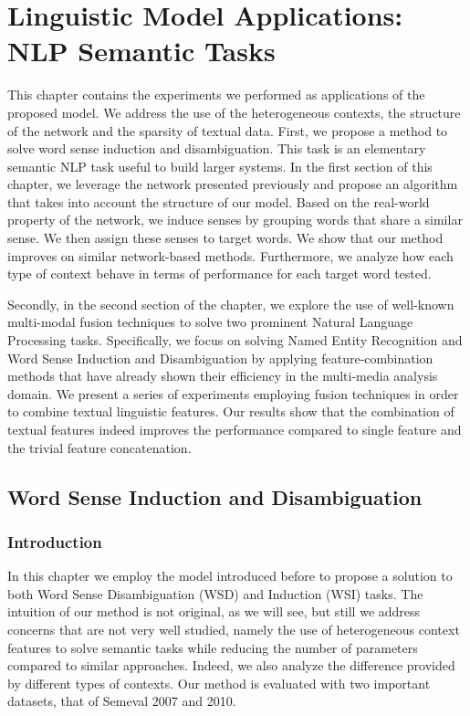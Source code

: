 \chapter{Linguistic Model Applications: NLP Semantic Tasks} 
\label{chap:wsd}
\begin{abstractchap}
This chapter contains the experiments we performed as applications of the proposed model. We address the use of the heterogeneous contexts, the structure of the network and the sparsity of textual data.
First, we propose a method to solve word sense induction and disambiguation. This task is an elementary semantic NLP task useful to build larger systems. In the first section of this chapter, we leverage the network presented previously and propose an algorithm that takes into account the structure of our model. Based on the real-world property of the network, we induce senses by grouping words that share a similar sense. We then assign these senses to target words. We show that our method improves on similar network-based methods. Furthermore, we analyze how each type of context behave in terms of performance for each target word tested.

Secondly, in the second section of the chapter, we explore the use of well-known multi-modal fusion techniques to solve two prominent Natural Language Processing tasks. Specifically, we focus on solving Named Entity Recognition and Word Sense Induction and Disambiguation by applying feature-combination methods that have already shown their efficiency in the multi-media analysis domain. We present a series of experiments employing fusion techniques in order to combine textual linguistic features. Our results show that the combination of textual features indeed improves the performance compared to single feature and the trivial feature concatenation. 

\end{abstractchap}

\minitoc
\section{Word Sense Induction and Disambiguation}
\subsection{Introduction}
\label{chap5:intro}
In this chapter we employ the model introduced before to propose a solution to both Word Sense Disambiguation (WSD) and Induction  (WSI) tasks. The intuition of our method is not original, as we will see, but still we address concerns that are not very well studied, namely the use of heterogeneous context features to solve semantic tasks while reducing the number of parameters compared to similar approaches. Indeed, we also analyze the difference provided by different types of contexts. Our method is evaluated with two important datasets, that of Semeval 2007 and 2010.

